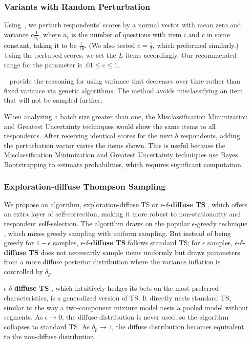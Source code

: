 \documentclass[nonblindrev]{informs3}
\newcommand{\edts}{$\epsilon$-$\delta$-\textbf{diffuse TS} }
\newcommand{\numperset}{L}
\begin{document}
\subsubsection{Variants with Random Perturbation}

Using~\cite{toubia2007adaptive},  we perturb respondents' scores by a normal vector with mean zero and variance $c\frac{1}{n_i}$, where $n_i$ is the number of questions with item $i$ and $c$ in some constant, taking it to be $\frac{1}{10}$. (We also tested $c=\frac{1}{2}$, which preformed similarly.) Using the pertubed scores, we set the $\numperset$ items accordingly. Our recommended range for the parameter is $.01 \leq c \leq 1$.

~\cite{toubia2007adaptive} provide the reasoning for using variance that decreases over time rather than fixed variance via genetic algorithms. The method avoids misclassifying an item that will not be sampled further.

When analyzing a batch size greater than one, the Misclassification Minimization and Greatest Uncertainty techniques would show the same items to all respondents. After receiving identical scores for the next $b$ respondents, adding the perturbation vector varies the items shown. This is useful because the Misclassification Minimization and Greatest Uncertainty techniques use Bayes Bootstrapping to estimate probabilities, which requires significant computation.

\subsubsection{Exploration-diffuse Thompson Sampling} \label{sec:edts}

We propose an algorithm, exploration-diffuse TS or \edts, which offers an extra layer of self-correction, making it more robust to non-stationarity and respondent self-selection. The algorithm draws on the popular $\epsilon$-greedy technique \citep{SuttonBarto1998}, which mixes greedy sampling with uniform sampling. But instead of being greedy for $1-\epsilon$ samples, \edts follows standard TS; for $\epsilon$ samples, \edts does not necessarily sample items uniformly but draws parameters from a more diffuse posterior distribution where the variance inflation is controlled by $\delta_p$.

\edts, which intuitively hedges its bets on the most preferred characteristics, is a generalized version of TS. It directly nests standard TS, similar to the way a two-component mixture model nests a pooled model without segments. As $\epsilon \to 0$, the diffuse distribution is never used, so the algorithm collapses to standard TS. As $\delta_p \to 1$, the diffuse distribution becomes equivalent to the non-diffuse distribution. 
\end{document}
